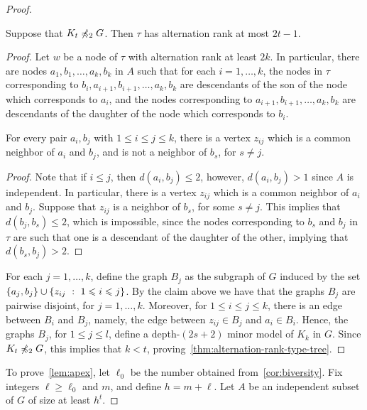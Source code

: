 \begin{proof}
\begin{lemma}\label{thm:alternation-rank-type-tree}
Suppose that  $K_t\not\preccurlyeq_{2} G$.
Then $\tau$ has alternation rank at most $2t-1$.
\end{lemma}
\begin{proof}
	Let $w$ be a node of $\tau$ with alternation rank at least $2k$.  
	In particular, there are nodes $a_1,b_1,\ldots,a_k,b_k$ in $A$
	such that for each $i=1,\ldots,k$, 
	the nodes in $\tau$ corresponding to $b_i,a_{i+1},b_{i+1},\ldots,a_k,b_k$ are  descendants of the son of the node which corresponds to $a_i$,
	and the nodes corresponding to $a_{i+1},b_{i+1},\ldots,a_k,b_k$
	are descendants of the daughter of the node which corresponds to $b_i$.
	
	\begin{claim}
		For every pair $a_i,b_j$ with $1\le i\le j\le k$, there is a vertex $z_{ij}$
		which is a common neighbor of $a_i$ and $b_j$,
		and is not a neighbor of $b_s$, for $s\neq j$.
	\end{claim}
	\begin{proof}
		Note that if $i\le j$, then $d(a_i,b_j)\le 2$, however, $d(a_i,b_j)>1$ since $A$
		is independent. In particular, there is a vertex $z_{ij}$ which is a common neighbor of $a_i$ and $b_j$. 
		Suppose that $z_{ij}$ is a neighbor of $b_s$, for some $s\neq j$. This implies that $d(b_j,b_s)\le 2$, which is impossible, 
since
		 the nodes corresponding to $b_s$ and $b_j$ in $\tau$ are such that one is a descendant of the daughter of the other, implying that $d(b_s,b_j)>2$.
	\end{proof}
  


For each $j=1,\ldots,k$, define the graph $B_j$
as the subgraph of $G$ induced by the set
$\{a_j,b_j\}\cup\{z_{ij}~:~ 1\leqslant i\leqslant  j\}$.
By the claim above we have that the graphs $B_j$
are pairwise disjoint, for $j=1,\ldots,k$.
Moreover, for $1\le i\le j\le k$, there is an edge between $B_i$
and $B_j$, namely, the edge between $z_{ij}\in B_j$
and $a_i\in B_i$.
Hence, the graphs $B_j$, for $1\le j\le l$, define a depth-$(2s+2)$ minor model of $K_k$ in $G$. Since $K_t\not\preccurlyeq_{2}G$, this implies that $k<t$, proving~\cref{thm:alternation-rank-type-tree}.
\end{proof}

To prove~\cref{lem:apex}, let $\ell_0$
be the number obtained from~\cref{cor:biversity}.
Fix integers $\ell\ge \ell_0$ and $m$, and define $h=m+\ell$.
Let $A$ be an independent subset of $G$
of size at least $h^{t}$.


\end{proof}

